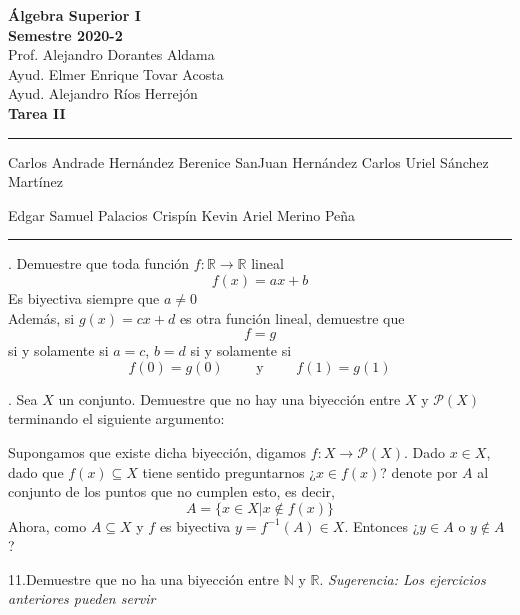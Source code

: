 \documentclass[letterpaper]{article}
\newcommand{\R}{\mathds{R}}
\newcommand{\N}{\mathds{N}}
\renewcommand{\P}{\mathcal{P}}
\renewcommand{\*}{\cdot}
\theoremstyle{definition}
\begin{document}
\begin{center}
	\vspace{-114pt}
	\textbf{\large Álgebra Superior I}\\
	\textbf{ Semestre 2020-2}\\
	Prof. Alejandro Dorantes Aldama\\
	Ayud. Elmer Enrique Tovar Acosta \\
	Ayud. Alejandro Ríos Herrejón \\
	\textbf{Tarea II}
\rule{19cm}{0.3mm}
	Carlos Andrade Hernández \hspace{2cm} Berenice SanJuan Hernández \hspace{2cm} Carlos Uriel Sánchez Martínez \\
	\begin{center}
	Edgar Samuel Palacios Crispín \hspace{2cm} Kevin Ariel Merino Peña
	\end{center}
	\vspace{-14pt}
\rule{19cm}{0.3mm}
\end{center}
. Demuestre que toda función $ f: \R \to \R $ lineal 
\[ f(x) = ax +b \]
Es biyectiva siempre que $ a \neq 0 $\\

Además, si $ g(x) = cx + d $ es otra función lineal, demuestre que \[f = g\] si y solamente si $a = c $, $ b = d $ si y solamente si \[ f(0) = g(0) \qquad \text{ y } \qquad f(1) = g(1) \]

. Sea $ X $ un conjunto. Demuestre que no hay una biyección entre $ X $ y $ \P(X) $ terminando el siguiente argumento:
\begin{center}
\parbox[b][3cm][c]{0.7\textwidth}{Supongamos que existe dicha biyección, digamos $ f: X \to \P(X) $. Dado $ x \in X $, dado que $ f(x) \subseteq X $ tiene sentido preguntarnos ¿$ x \in f(x) $? denote por $ A $ al conjunto de los puntos que no cumplen esto, es decir,
\[ A = \{ x \in X | x \notin f(x) \} \]
Ahora, como $ A \subseteq X $ y $ f $ es biyectiva $ y = f^{-1}(A) \in X $. Entonces ¿$ y \in A $ o $ y \notin A $ ? 
}
\end{center}



\noindent11.Demuestre que no ha una biyección entre $ \N $ y $ \R $. \textit{Sugerencia: Los ejercicios anteriores pueden servir}
\end{document}
